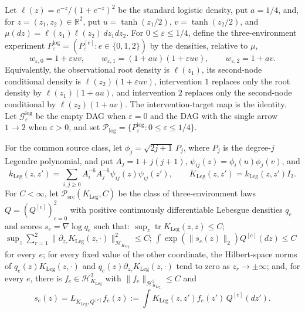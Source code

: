 Let \(\ell(z)=e^{-z}/(1+e^{-z})^2\) be the standard logistic density, put \(a=1/4\), and, for \(z=(z_1,z_2)\in\mathbb R^2\), put \(u=\tanh(z_1/2)\), \(v=\tanh(z_2/2)\), and \(\mu(dz)=\ell(z_1)\ell(z_2)\,dz_1dz_2\).  For \(0\le\varepsilon\le1/4\), define the three-environment experiment \(P_{\varepsilon}^{\mathrm{log}}=(P_{\varepsilon}^{[e]}:e\in\{0,1,2\})\) by the densities, relative to \(\mu\),
\[
 w_{\varepsilon,0}=1+\varepsilon uv,\qquad
 w_{\varepsilon,1}=(1+au)(1+\varepsilon uv),\qquad
 w_{\varepsilon,2}=1+av.
\]
Equivalently, the observational root density is \(\ell(z_1)\), its second-node conditional density is \(\ell(z_2)(1+\varepsilon uv)\), intervention \(1\) replaces only the root density by \(\ell(z_1)(1+au)\), and intervention \(2\) replaces only the second-node conditional by \(\ell(z_2)(1+av)\).  The intervention-target map is the identity.  Let \(\mathcal G_{\varepsilon}^{\mathrm{log}}\) be the empty DAG when \(\varepsilon=0\) and the DAG with the single arrow \(1\to2\) when \(\varepsilon>0\), and set \(\mathcal P_{\mathrm{log}}=\{P_{\varepsilon}^{\mathrm{log}}:0\le\varepsilon\le1/4\}\).

For the common source class, let \(\phi_j=\sqrt{2j+1}\,P_j\), where \(P_j\) is the degree-\(j\) Legendre polynomial, and put \(A_j=1+j(j+1)\), \(\psi_{ij}(z)=\phi_i(u)\phi_j(v)\), and
\[
 k_{\mathrm{Leg}}(z,z')=
 \sum_{i,j\ge0}A_i^{-6}A_j^{-6}\psi_{ij}(z)\psi_{ij}(z'),
 \qquad
 K_{\mathrm{Leg}}(z,z')=k_{\mathrm{Leg}}(z,z')I_2.
\]
For \(C<\infty\), let \(\mathcal P_{\mathrm{src}}(K_{\mathrm{Leg}},C)\) be the class of three-environment laws \(Q=(Q^{[e]})_{e=0}^2\) with positive continuously differentiable Lebesgue densities \(q_e\) and scores \(s_e=\nabla\log q_e\) such that: \(\sup_z\operatorname{tr}K_{\mathrm{Leg}}(z,z)\le C\); \(\sup_z\sum_{r=1}^2\|\partial_{z_r}K_{\mathrm{Leg}}(z,\cdot)\|_{\mathcal H_{K_{\mathrm{Leg}}}}^2\le C\); \(\int\exp(\|s_e(z)\|_2)Q^{[e]}(dz)\le C\) for every \(e\); for every fixed value of the other coordinate, the Hilbert-space norms of \(q_e(z)K_{\mathrm{Leg}}(z,\cdot)\) and \(q_e(z)\partial_{z_r}K_{\mathrm{Leg}}(z,\cdot)\) tend to zero as \(z_r\to\pm\infty\); and, for every \(e\), there is \(f_e\in\mathcal H_{K_{\mathrm{Leg}}}^2\) with \(\|f_e\|_{\mathcal H_{K_{\mathrm{Leg}}}^2}\le C\) and
\[
 s_e(z)=L_{K_{\mathrm{Leg}},Q^{[e]}}f_e(z)
 :=\int K_{\mathrm{Leg}}(z,z')f_e(z')\,Q^{[e]}(dz').
\]

